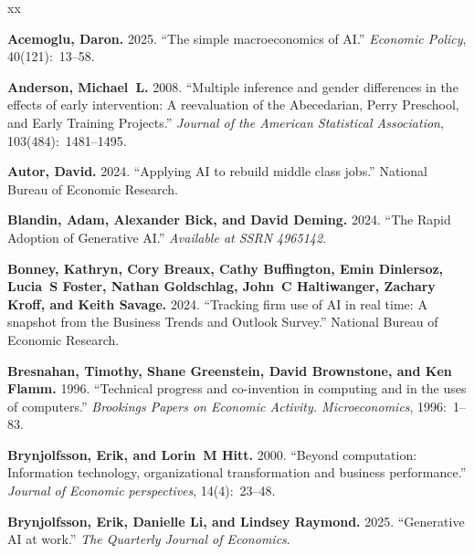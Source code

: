 \documentclass{article}
\begin{document}
\begin{thebibliography}{xx}

{\bf Acemoglu, Daron.} 2025. ``The simple macroeconomics of AI.'' {\em Economic Policy}, 40(121):~13--58.

{\bf Anderson, Michael~L.} 2008. ``Multiple inference and gender differences in the effects of early intervention: A reevaluation of the Abecedarian, Perry Preschool, and Early Training Projects.'' {\em Journal of the American Statistical Association}, 103(484):~1481--1495.

{\bf Autor, David.} 2024. ``Applying AI to rebuild middle class jobs.'' National Bureau of Economic Research.

{\bf Blandin, Adam, Alexander Bick, and David Deming.} 2024. ``The Rapid Adoption of Generative AI.'' {\em Available at SSRN 4965142}.

{\bf Bonney, Kathryn, Cory Breaux, Cathy Buffington, Emin Dinlersoz, Lucia~S Foster, Nathan Goldschlag, John~C Haltiwanger, Zachary Kroff, and Keith Savage.} 2024. ``Tracking firm use of AI in real time: A snapshot from the Business Trends and Outlook Survey.'' National Bureau of Economic Research.

{\bf Bresnahan, Timothy, Shane Greenstein, David Brownstone, and Ken Flamm.} 1996. ``Technical progress and co-invention in computing and in the uses of computers.'' {\em Brookings Papers on Economic Activity. Microeconomics}, 1996:~1--83.

{\bf Brynjolfsson, Erik, and Lorin~M Hitt.} 2000. ``Beyond computation: Information technology, organizational transformation and business performance.'' {\em Journal of Economic perspectives}, 14(4):~23--48.

{\bf Brynjolfsson, Erik, Danielle Li, and Lindsey Raymond.} 2025. ``Generative AI at work.'' {\em The Quarterly Journal of Economics}.


\end{thebibliography}
\end{document}
